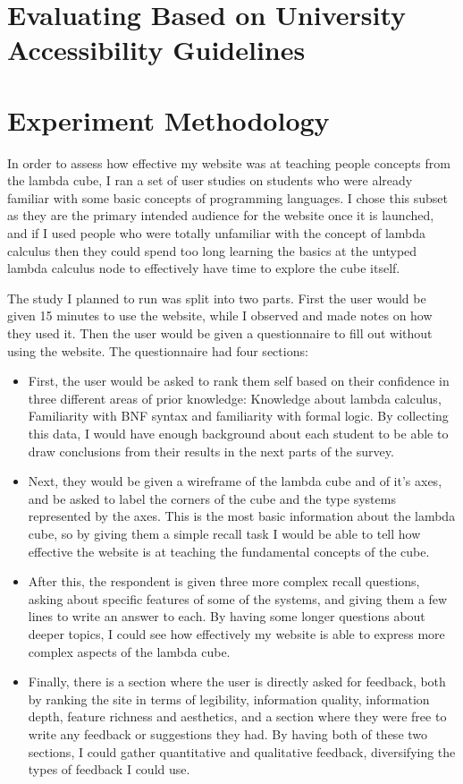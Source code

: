 \documentclass{l4proj}
\begin{document}
\section{Evaluating Based on University Accessibility Guidelines}

\section{Experiment Methodology}

In order to assess how effective my website was at teaching people concepts from the lambda cube, I ran a set of user studies on students who were already familiar with some basic concepts of programming languages.  I chose this subset as they are the primary intended audience for the website once it is launched, and if I used people who were totally unfamiliar with the concept of lambda calculus then they could spend too long learning the basics at the untyped lambda calculus node to effectively have time to explore the cube itself.

The study I planned to run was split into two parts.  First the user would be given 15 minutes to use the website, while I observed and made notes on how they used it.  Then the user would be given a questionnaire to fill out without using the website.  The questionnaire had four sections:

\begin{itemize}
    \item First, the user would be asked to rank them self based on their confidence in three different areas of prior knowledge: Knowledge about lambda calculus, Familiarity with BNF syntax and familiarity with formal logic.  By collecting this data, I would have enough background about each student to be able to draw conclusions from their results in the next parts of the survey.

    \item Next, they would be given a wireframe of the lambda cube and of it's axes, and be asked to label the corners of the cube and the type systems represented by the axes.  This is the most basic information about the lambda cube, so by giving them a simple recall task I would be able to tell how effective the website is at teaching the fundamental concepts of the cube.

    \item After this, the respondent is given three more complex recall questions, asking about specific features of some of the systems, and giving them a few lines to write an answer to each.  By having some longer questions about deeper topics, I could see how effectively my website is able to express more complex aspects of the lambda cube.

    \item Finally, there is a section where the user is directly asked for feedback, both by ranking the site in terms of legibility, information quality, information depth, feature richness and aesthetics, and a section where they were free to write any feedback or suggestions they had.  By having both of these two sections, I could gather quantitative and qualitative feedback, diversifying the types of feedback I could use.
\end{itemize}
\end{document}
